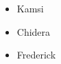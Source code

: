 \documentclass{article}
\begin{document}
	\begin{itemize}
		\item Kamsi
		\item Chidera
		\item Frederick
	\end{itemize}
\end{document}
